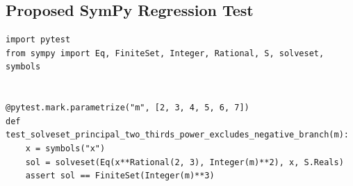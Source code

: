 \documentclass[11pt]{article}
\begin{document}
\subsection{Proposed SymPy Regression Test}

\medskip

\begin{lstlisting}[style=bugpython]
import pytest
from sympy import Eq, FiniteSet, Integer, Rational, S, solveset, symbols


@pytest.mark.parametrize("m", [2, 3, 4, 5, 6, 7])
def test_solveset_principal_two_thirds_power_excludes_negative_branch(m):
    x = symbols("x")
    sol = solveset(Eq(x**Rational(2, 3), Integer(m)**2), x, S.Reals)
    assert sol == FiniteSet(Integer(m)**3)
\end{lstlisting}
\end{document}
